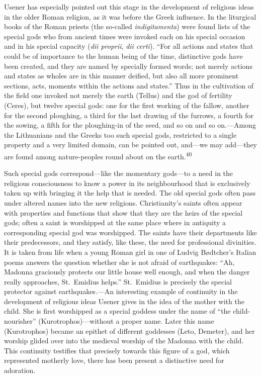 \documentclass[12pt,a4paper]{book}
\newcommand{\opage}[1]{\marginnote{\footnotesize\textit{[#1]}}}
\begin{document}
Usener has especially pointed out this stage in the development of religious ideas in the
older Roman religion, as it was before the Greek influence. In the liturgical books of the
Roman priests (the so-called \textit{indigitamenta}) were found lists of the special gods
who from ancient times were invoked each on his special occasion and in his special
capacity (\textit{dii proprii}, \textit{dii certi}). ``For all actions and states that
could be of importance to the human being of the time, distinctive gods have been created,
and they are named by specially formed words; not merely actions and states as wholes are
in this manner deified, but also all more prominent sections, acts, moments within the
actions and states.'' Thus in the cultivation of the field one invoked not merely the
earth (Tellus) and the god of fertility (Ceres), but twelve special gods: one for the first
working of the fallow, another for the second ploughing, a third for the last drawing of
the furrows, a fourth for the sowing, a fifth for the ploughing-in of the seed, and so on
and so on.---Among the Lithuanians and the Greeks too such special gods, restricted to a
single property and a very limited domain, can be pointed out, and---we may add---they are
found among nature-peoples round about on the earth.\textsuperscript{40}

Such special gods correspond---like the momentary gods---to a need in the religious
consciousness to know a power in its neighbourhood that is exclusively taken up with
bringing it the help 
\opage{92}that is needed. The old special gods often pass under altered names
into the new religions. Christianity's saints often appear with properties and functions
that show that they are the heirs of the special gods; often a saint is worshipped at the
same place where in antiquity a corresponding special god was worshipped. The saints have
their departments like their predecessors, and they satisfy, like these, the need for
professional divinities. It is taken from life when a young Roman girl in one of Ludvig
Bødtcher's Italian poems answers the question whether she is not afraid of earthquakes:
``Ah, Madonna graciously protects our little house well enough, and when the danger really
approaches, St.~Emidius helps.'' St.~Emidius is precisely the special protector against
earthquakes.---An interesting example of continuity in the development of religious ideas
Usener gives in the idea of the mother with the child. She is first worshipped as a special
goddess under the name of ``the child-nourisher'' (Kurotrophos)---without a proper name.
Later this name (Kurotrophos) became an epithet of different goddesses (Leto, Demeter), and
her worship glided over into the medieval worship of the Madonna with the child. This
continuity testifies that precisely towards this figure of a god, which represented motherly
love, there has been present a distinctive need for adoration.
\end{document}
